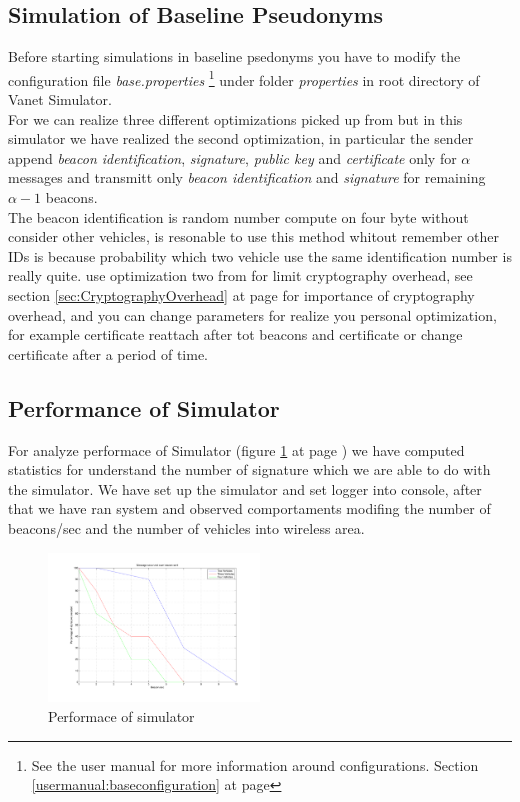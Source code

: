 \subsection{Simulation of Baseline Pseudonyms}
Before starting simulations in baseline psedonyms you have to modify the configuration file \textit{base.properties} \footnote{See the user manual for more information around configurations. Section \ref{usermanual:baseconfiguration} at page \pageref{usermanual:baseconfiguration}} under folder \textit{properties} in root directory of Vanet Simulator.\\
For \baseline we can realize three different optimizations picked up from \cite{calandriello} but in this simulator we have realized the second optimization, in particular the sender append \textit{beacon identification}, \textit{signature}, \textit{public key} and \textit{certificate} only for $\alpha$ messages and transmitt only \textit{beacon identification} and \textit{signature} for remaining $\alpha-1$ beacons. \\
The beacon identification is random number compute on four byte without consider other vehicles, is resonable to use this method whitout remember other IDs is because probability which two vehicle use the same identification number is really quite.
\baseline use optimization two from \cite{calandriello} for limit cryptography overhead, see section \ref{sec:CryptographyOverhead} at page \pageref{sec:CryptographyOverhead} for importance of cryptography overhead, and you can change parameters for realize you personal optimization, for example certificate reattach after tot beacons and certificate or change certificate after a period of time.
\subsection{Performance of Simulator}
For analyze performace of Simulator (figure \ref{fig:performance} at page \pageref{fig:performance}) we have computed statistics for understand the number of signature which we are able to do with the simulator. We have set up the \baseline simulator and set logger into console, after that we have ran system and observed comportaments modifing the number of beacons/sec and the number of vehicles into wireless area.
\begin{figure}[ht]
\centerline{\includegraphics[width=0.5\textwidth]{chart_baseline.pdf}}
\caption{Performace of simulator}
\label{fig:performance}
\end{figure}
